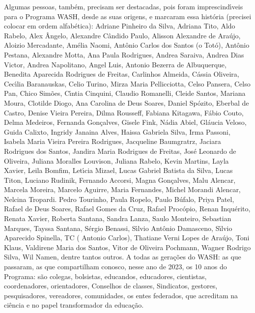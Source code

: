 \begin{agradecimentos}
Algumas pessoas, tamb\'em, precisam ser destacadas, pois foram imprescind\'{\i}veis para o Programa WASH, desde as suas origens, e marcaram essa hist\'oria (precisei colocar em ordem alfab\'etica): Adriane Pinheiro da Silva, Adriana Tito, Aldo Rabelo, Alex \^Angelo, Alexandre C\^andido Paulo, Alisson Alexandre de Ara\'ujo, Aloizio Mercadante, Am\'elia Naomi, Ant\^onio Carlos dos Santos (o Tot\'o), Ant\^onio Pestana, Alexandre Motta, Ana Paula Rodrigues, Andrea Saraiva, Andrea Dias Victor, Andrea Napolitano, Angel Luis, Antonio Bezerra de Albuquerque, Benedita Aparecida Rodrigues de Freitas, Carlinhos Almeida, C\'assia Oliveira, Cec\'{\i}lia Baranauskas, Celio Turino, Mirza Maria Pellicciotta, Celso Pansera, Celso Pan, Chico Sim\~oes, C\'{\i}ntia Cinquini, Claudio Romanelli, Cleide Santos, Mariana Moura, Clotilde Diogo, Ana Carolina de Deus Soares, Daniel Sp\'ozito, Eberbal de Castro, Denise  Vieira Pereira, Dilma Rousseff,  Fabiana Kitagawa, F\'abio Couto, Delma  Medeiros, Fernanda Gon\c{c}alves, Gisele Fink, N\'adia Abiel, Gl\'aucia Veloso, Guida Calixto,  Ingridy Janaina Alves, Haissa Gabriela Silva, Irma Passoni, Isabela Maria Vieira Pereira Rodrigues, Jacqueline Baumgratrz, Jaciara Rodrigues dos Santos, Jandira Maria Rodrigues de Freitas, Jos\'e Leonardo de Oliveira, Juliana Moralles Louvison, Juliana Rabelo, Kevin Martins, Layla Xavier, Leila Bomfim, Let\'{\i}cia Mizael, Lucas Gabriel Batista da Silva, Lucas Titon, Luciano Rudinik, Fernando Accorsi, Magna Gon\c{c}alves, Malu Alencar, Marcela Moreira, Marcelo Aguirre, Maria Fernandes, Michel Morandi Alencar, Nelcina Tropardi. Pedro Tourinho, Paula Ropelo, Paulo B\'ufalo, Priya Patel, Rafael de Deus Soares, Rafael Gomes da Cruz, Rafael Proc\'opio, Renan Inqu\'erito, Renata Xavier, Roberta Santana,  Sandra Lanza, Saulo Monteiro, Sebastian Marques, Tayssa Santana,  S\'ergio Benassi, S\'{\i}lvio Ant\^onio Damasceno, S\'{\i}lvio Aparecido Spinella, TC ( Antonio Carlos), Thatiane Verni Lopes de Ara\'ujo, Toni Klaus, Valdirene Maria dos Santos, Vitor de Oliveira Pochmann, Wagner Rodrigo Silva, Wil Namen, dentre tantos outros.
A todas as gera\c{c}\~oes do WASH: as que passaram, as que compartilham conosco, nesse ano de 2023, os 10 anos do Programa: s\~ao colegas, bolsistas, educandos, educadores, cientistas, coordenadores, orientadores, Conselhos de classes, Sindicatos, gestores, pesquisadores, vereadores, comunidades, os entes federados, que acreditam na ci\^encia e no papel transformador da educa\c{c}\~ao.

\end{agradecimentos}
